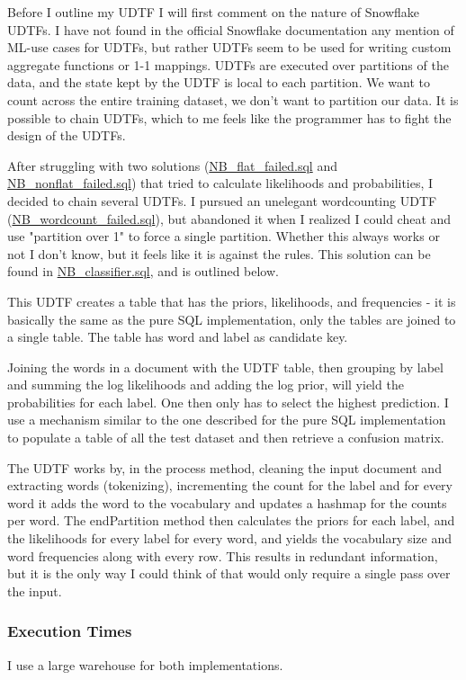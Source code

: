 \documentclass{article}
\begin{document}
\medskip \noindent Before I outline my UDTF I will first comment on the nature of Snowflake UDTFs. I have not found in the official Snowflake documentation any mention of ML-use cases for UDTFs, but rather UDTFs seem to be used for writing custom aggregate functions or 1-1 mappings. UDTFs are executed over partitions of the data, and the state kept by the UDTF is local to each partition. 
We want to count across the entire training dataset, we don't want to partition our data. It is possible to chain UDTFs, which to me feels like the programmer has to fight the design of the UDTFs. 

\medskip \noindent After struggling with two solutions (\url{NB_flat_failed.sql} and \url{NB_nonflat_failed.sql}) that tried to calculate likelihoods and probabilities, I decided to chain several UDTFs. I pursued an unelegant wordcounting UDTF (\url{NB_wordcount_failed.sql}), but abandoned it when I realized I could cheat and use "partition over 1" to force a single partition. Whether this always works or not I don't know, but it feels like it is against the rules. This solution can be found in \url{NB_classifier.sql}, and is outlined below. 

\medskip \noindent This UDTF creates a table that has the priors, likelihoods, and frequencies - it is basically the same as the pure SQL implementation, only the tables are joined to a single table. The table has word and label as candidate key. 

\medskip \noindent Joining the words in a document with the UDTF table, then grouping by label and summing the log likelihoods and adding the log prior, will yield the probabilities for each label. One then only has to select the highest prediction. I use a mechanism similar to the one described for the pure SQL implementation to populate a table of all the test dataset and then retrieve a confusion matrix. 

\medskip \noindent The UDTF works by, in the process method, cleaning the input document and extracting words (tokenizing), incrementing the count for the label and for every word it adds the word to the vocabulary and updates a hashmap for the counts per word. The endPartition method then calculates the priors for each label, and the likelihoods for every label for every word, and yields the vocabulary size and word frequencies along with every row. This results in redundant information, but it is the only way I could think of that would only require a single pass over the input. 

\subsubsection{Execution Times}
I use a large warehouse for both implementations. 
\end{document}
